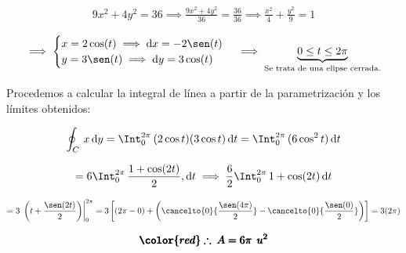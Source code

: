 \documentclass[12pt]{article}
\begin{document}
\begin{align*}
	9x^2 + 4y^2 = 36 \implies \frac{9x^2 + 4y^2}{36} = \frac{36}{36} \implies \frac{x^2}{4} + \frac{y^2}{9} = 1
\end{align*}

\begin{align*}
	\implies \begin{cases}
		x = 2\cos(t) \implies \mathrm{d}x = -2\sen(t)\\
		y = 3\sen(t) \implies \mathrm{d}y = 3\cos(t)\\
	\end{cases} \implies \underbrace{0 \leq t \leq 2\pi}_{\text{Se trata de una elipse cerrada.}}
\end{align*}

\noindent Procedemos a calcular la integral de línea a partir de la parametrización y los límites obtenidos:

\begin{align*}
	\oint_C\, x\,\mathrm{d}y = \Int_{0}^{2\pi}\, (2\cos t)(3\cos t)\,\mathrm{d}t = \Int_{0}^{2\pi}\, (6\cos^2 t)\,\mathrm{d}t
\end{align*}

\begin{align*}
	= 6\Int_{0}^{2\pi}\, \frac{1+\cos(2t)}{2},\mathrm{d}t
	\implies \frac{6}{2}\Int_{0}^{2\pi}\, 1+\cos(2t)\,\mathrm{d}t
\end{align*}

\begin{align*}
	= 3\,\left.\left(t + \frac{\sen(2t)}{2}\right)\right|_{0}^{2\pi} = 3\left[ \left(2\pi - 0\right) + \left( \cancelto{0}{\frac{\sen(4\pi)}{2}} - \cancelto{0}{\frac{\sen(0)}{2}} \right) \right] = 3(2\pi)
\end{align*}

\begin{align*}
	\pmb{\color{red} \therefore\: A = 6\pi\: \: u^2}
\end{align*}
\end{document}
